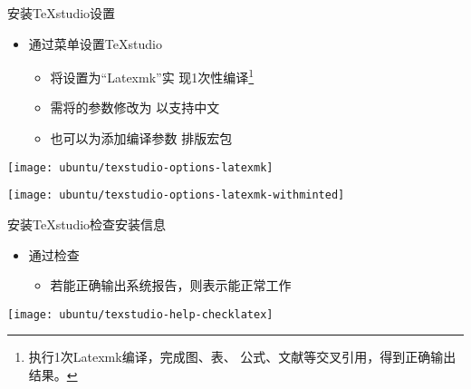 \documentclass[fontset = none, t]{ctexbeamer}
\begin{document}
\begin{frame}{安装TeXstudio}{设置}
  \begin{spacing}{1.5}
    \begin{itemize}
    \item 通过菜单设置TeXstudio%
      \begin{itemize}
      \item 将设置为\alert{\enquote{Latexmk}}实
        现1次性编译\footnote[frame,2]{执行1次Latexmk编译，完成图、表、
          公式、文献等交叉引用，得到正确输出结果。}
      \item 需将的参数修改为
        以支持中文
      \item 也可以为添加编译参数
        排版宏包
      \end{itemize}
    \end{itemize}
    \begin{center}
      \begin{annotatedFigure}
        {\texttt{[image: ubuntu/texstudio-options-latexmk]}}
      \end{annotatedFigure}
      \begin{annotatedFigure}
        {\texttt{[image: ubuntu/texstudio-options-latexmk-withminted]}}
      \end{annotatedFigure}
    \end{center}
  \end{spacing}
\end{frame}

\begin{frame}{安装TeXstudio}{检查\tl 安装信息}
  \begin{spacing}{1.2}
    \begin{itemize}
    \item 通过检查%
      \begin{itemize}
      \item 若能正确输出\alert{系统报告}，则表示\tl 能正常工作
      \end{itemize}
    \end{itemize}
    \begin{center}
      \texttt{[image: ubuntu/texstudio-help-checklatex]}      
    \end{center}
  \end{spacing}
\end{frame}
\end{document}
